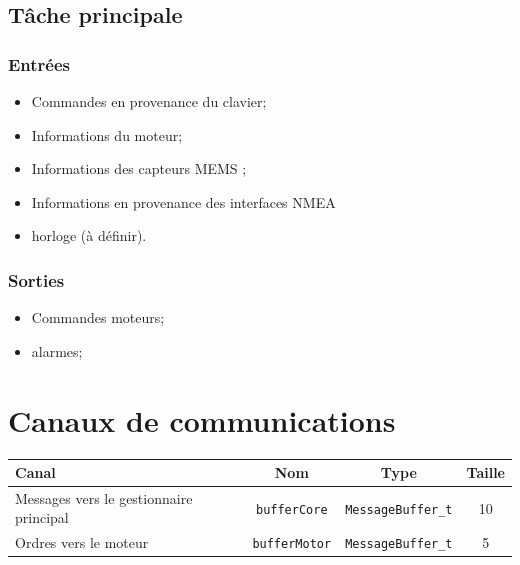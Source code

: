 \documentclass[a4paper,11pt]{report}
\begin{document}


\subsection{Tâche principale}
\subsubsection{Entrées}
\begin{itemize}
  \item Commandes en provenance du clavier;
  \item Informations du moteur;
  \item Informations des capteurs MEMS ;
  \item Informations en provenance des interfaces NMEA
  \item horloge (à définir).
\end{itemize}
\subsubsection{Sorties}
\begin{itemize}
  \item Commandes moteurs;
  \item alarmes;
\end{itemize}

\section{Canaux de communications}

\begin{tabular}{|l|c|c|c|}
\hline
Canal & Nom & Type & Taille \\
\hline
Messages vers le gestionnaire principal & \texttt{bufferCore} & \texttt{MessageBuffer\_t} & 10 \\
\hline 
Ordres vers le moteur & \texttt{bufferMotor} & \texttt{MessageBuffer\_t} & 5 \\ 
\hline
\end{tabular}
\end{document}
